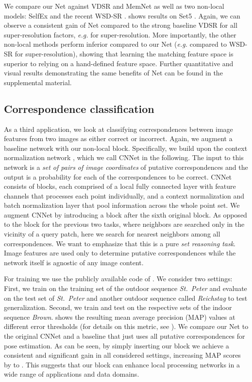 \documentclass{article}
\makeatletter
\newcommand{\eg}{\emph{e.\thinspace{}g.}\@\xspace}
\makeatother
\begin{document}
We compare our Net against VDSR and MemNet as well as two non-local models: SelfEx \cite{Huang:2015:SelfEx} and the recent WSD-SR \cite{Cruz:2018:SIS}.
 shows results on Set5 \cite{Bevilacqua:2012:LCS}. 
Again, we can observe a consistent gain of Net compared to the strong baseline VDSR for all super-resolution factors, \eg  for  super-resolution.
More importantly, the other non-local methods perform inferior compared to our Net (\eg  compared to WSD-SR for  super-resolution), showing that learning the matching feature space is superior to relying on a hand-defined feature space.
Further quantitative and visual results demonstrating the same benefits of Net can be found in the supplemental material.

\subsection{Correspondence classification}
As a third application, we look at classifying correspondences between image features from two images as either correct or incorrect.
Again, we augment a baseline network with our non-local block.
Specifically, we build upon the context normalization network \cite{Yi:2018:LFG}, which we call CNNet in the following.
The input to this network is a \emph{set of pairs of image coordinates} of putative correspondences and the output is a probability for each of the correspondences to be correct.
CNNet consists of  blocks, each comprised of a local fully connected layer with  feature channels that processes each point individually, and a context normalization and batch normalization layer that pool information across the whole point set. 
We augment CNNet by introducing a  block after the sixth original block.
As opposed to the  block for the previous two tasks, where neighbors are searched only in the vicinity of a query patch, here we search for nearest neighbors among all correspondences.
We want to emphasize that this is a pure \emph{set reasoning task}.
Image features are used only to determine putative correspondences while the network itself is agnostic of any image content.

For training we use the publicly available code of \cite{Yi:2018:LFG}.
We consider two settings:
First, we train on the training set of the outdoor sequence \emph{St.~Peter} and evaluate on the test set of \emph{St.~Peter} and another outdoor sequence called \emph{Reichstag} to test generalization.
Second, we train and test on the respective sets of the indoor sequence \emph{Brown}.
 shows the resulting mean average precision (MAP) values at different error thresholds (for details on this metric, see \cite{Yi:2018:LFG}).
We compare our Net to the original CNNet and a baseline that just uses all putative correspondences for pose estimation.
As can be seen, by simply inserting our  block we achieve a consistent and significant gain in all considered settings, increasing MAP scores by  to .
This suggests that our  block can enhance local processing networks in a wide range of applications and data domains.
\end{document}
